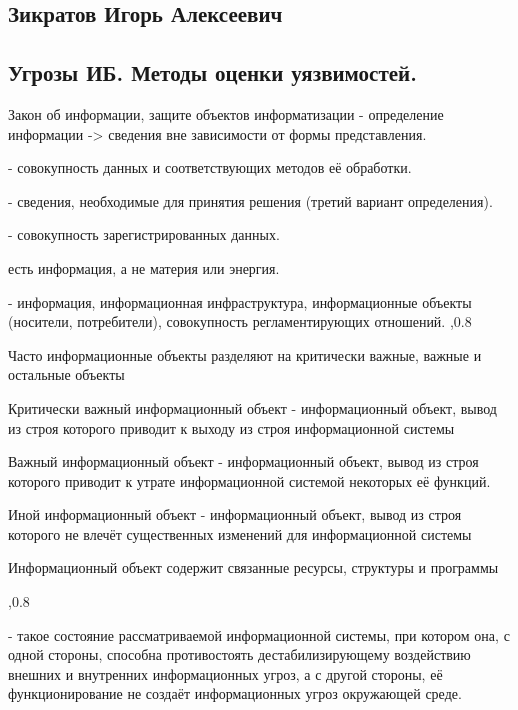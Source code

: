 \documentclass[a4paper,12pt]{report}
\begin{document}
	\def \nocredits {}
		\def \LineE {Конспект по дисциплине}
		\def \LineF {Теоретические основы КБ}

\maketitle

	\subsection{Зикратов Игорь Алексеевич}

	\subsection{Угрозы ИБ. Методы оценки уязвимостей.}
		Закон об информации, защите объектов информатизации - определение информации -> сведения вне зависимости от формы представления.

		 - совокупность данных и соответствующих методов её обработки.

		 - сведения, необходимые для принятия решения (третий вариант определения).

		 - совокупность зарегистрированных данных.

		 есть информация, а не материя или энергия.

		 -  информация, информационная инфраструктура, информационные объекты (носители, потребители), совокупность регламентирующих отношений.
		,0.8

		Часто информационные объекты разделяют на критически важные, важные и остальные объекты

		Критически важный информационный объект - информационный объект, вывод из строя которого приводит к выходу из строя информационной системы

		Важный информационный объект - информационный объект, вывод из строя которого  приводит к утрате информационной системой некоторых её функций.

		Иной информационный объект - информационный объект, вывод из строя которого не влечёт существенных изменений для информационной системы

		Информационный объект содержит связанные ресурсы, структуры и программы

		,0.8

		 - такое состояние рассматриваемой информационной системы, при котором она, с одной стороны, способна противостоять дестабилизирующему воздействию внешних и внутренних информационных угроз, а с другой стороны, её функционирование не создаёт информационных угроз окружающей среде.
\end{document}
